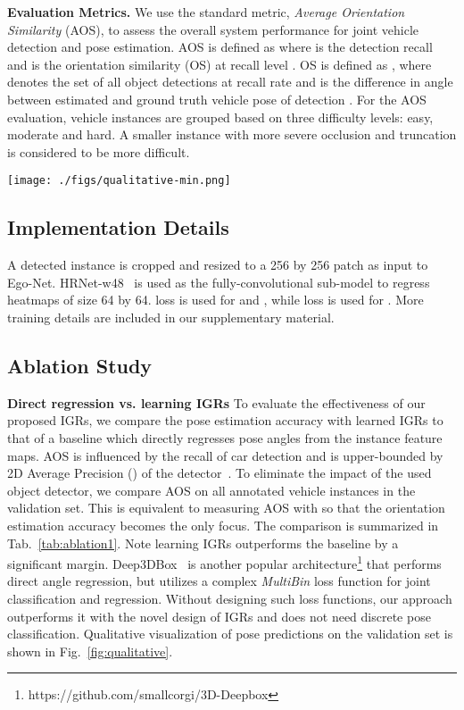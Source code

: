 \documentclass[final]{cvpr}
\begin{document}
\noindent\textbf{Evaluation Metrics.} We use the standard metric, \emph{Average Orientation Similarity} (AOS), to assess the overall system performance for joint vehicle detection and pose estimation. AOS is defined as  where  is the detection recall and  is the orientation similarity (OS) at recall level . OS is defined as , where  denotes the set of all object detections at recall rate  and  is the difference in angle between estimated and ground truth vehicle pose of detection . For the AOS evaluation, vehicle instances are grouped based on three difficulty levels: easy, moderate and hard. A smaller instance with more severe occlusion and truncation is considered to be more difficult.
\begin{figure*}[t]
	\begin{center}
		\texttt{[image: ./figs/qualitative-min.png]}
	\end{center}
	\caption{Qualitative results on the KITTI validation set where the red arrows indicate the vehicle poses. More examples can be found in our supplementary material.}
	\label{fig:qualitative}
\end{figure*}
\subsection{Implementation Details} 
A detected instance is cropped and resized to a 256 by 256 patch as input to Ego-Net. HRNet-w48~\cite{sun2019deep, wang2020deep} is used as the fully-convolutional sub-model  to regress heatmaps of size 64 by 64.  loss is used for  and , while  loss is used for . More training details are included in our supplementary material.

\subsection{Ablation Study}
\noindent \textbf{Direct regression vs. learning IGRs} To evaluate the effectiveness of our proposed IGRs, we compare the pose estimation accuracy with learned IGRs to that of a baseline which directly regresses pose angles from the instance feature maps. AOS is influenced by the recall of car detection and is upper-bounded by 2D Average Precision () of the detector~\cite{geiger2012we}. To eliminate the impact of the used object detector, we compare AOS on all annotated vehicle instances in the validation set. This is equivalent to measuring AOS with  so that the orientation estimation accuracy becomes the only focus. The comparison is summarized in Tab.~\ref{tab:ablation1}. Note learning IGRs outperforms the baseline by a significant margin. Deep3DBox~\cite{mousavian20173d} is another popular architecture\footnote{https://github.com/smallcorgi/3D-Deepbox} that performs direct angle regression, but utilizes a complex \emph{MultiBin} loss function for joint classification and regression. Without designing such loss functions, our approach outperforms it with the novel design of IGRs and does not need discrete pose classification. Qualitative visualization of pose predictions on the validation set is shown in Fig.~\ref{fig:qualitative}.
\end{document}
